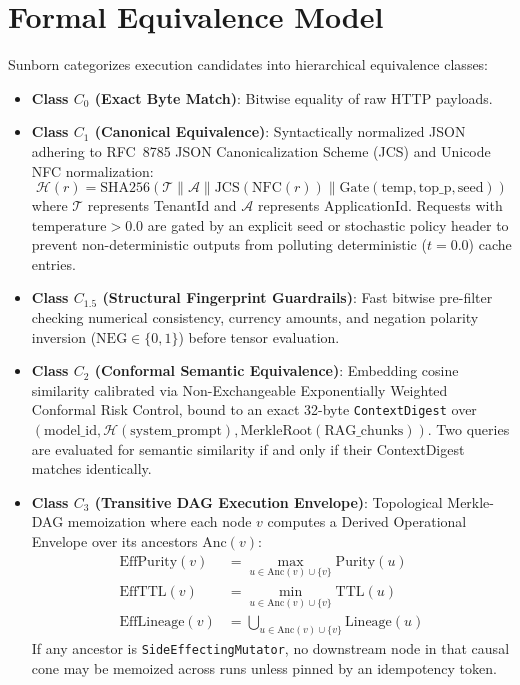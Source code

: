 \documentclass[sigconf,screen=true]{acmart}
\begin{document}
\section{Formal Equivalence Model}
Sunborn categorizes execution candidates into hierarchical equivalence classes:
\begin{itemize}
    \item \textbf{Class $C_0$ (Exact Byte Match)}: Bitwise equality of raw HTTP payloads.
    \item \textbf{Class $C_1$ (Canonical Equivalence)}: Syntactically normalized JSON adhering to RFC~8785 JSON Canonicalization Scheme (JCS) and Unicode NFC normalization:
    \begin{equation}
        \mathcal{H}(r) = \text{SHA256}(\mathcal{T} \parallel \mathcal{A} \parallel \text{JCS}(\text{NFC}(r)) \parallel \text{Gate}(\text{temp}, \text{top\_p}, \text{seed}))
    \end{equation}
    where $\mathcal{T}$ represents TenantId and $\mathcal{A}$ represents ApplicationId. Requests with $\text{temperature} > 0.0$ are gated by an explicit seed or stochastic policy header to prevent non-deterministic outputs from polluting deterministic ($t=0.0$) cache entries.
    \item \textbf{Class $C_{1.5}$ (Structural Fingerprint Guardrails)}: Fast bitwise pre-filter checking numerical consistency, currency amounts, and negation polarity inversion ($\text{NEG} \in \{0, 1\}$) before tensor evaluation.
    \item \textbf{Class $C_2$ (Conformal Semantic Equivalence)}: Embedding cosine similarity calibrated via Non-Exchangeable Exponentially Weighted Conformal Risk Control, bound to an exact 32-byte \texttt{ContextDigest} over $(\text{model\_id}, \mathcal{H}(\text{system\_prompt}), \text{MerkleRoot}(\text{RAG\_chunks}))$. Two queries are evaluated for semantic similarity if and only if their ContextDigest matches identically.
    \item \textbf{Class $C_3$ (Transitive DAG Execution Envelope)}: Topological Merkle-DAG memoization where each node $v$ computes a Derived Operational Envelope over its ancestors $\text{Anc}(v)$:
    \begin{align}
        \text{EffPurity}(v) &= \max_{u \in \text{Anc}(v) \cup \{v\}} \text{Purity}(u) \\
        \text{EffTTL}(v) &= \min_{u \in \text{Anc}(v) \cup \{v\}} \text{TTL}(u) \\
        \text{EffLineage}(v) &= \bigcup_{u \in \text{Anc}(v) \cup \{v\}} \text{Lineage}(u)
    \end{align}
    If any ancestor is \texttt{SideEffectingMutator}, no downstream node in that causal cone may be memoized across runs unless pinned by an idempotency token.
\end{itemize}
\end{document}
